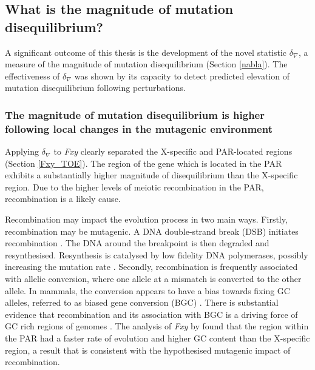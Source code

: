 \subsection{What is the magnitude of mutation disequilibrium?}

A significant outcome of this thesis is the development of the novel statistic $\delta_\nabla$, a measure of the magnitude of mutation disequilibrium (Section \ref{nabla}). The effectiveness of $\delta_\nabla$ was shown by its capacity to detect predicted elevation of mutation disequilibrium following perturbations. 

\subsubsection{The magnitude of mutation disequilibrium is higher following local changes in the mutagenic environment}

Applying $\delta_\nabla$ to \textit{Fxy} clearly separated the X-specific and PAR-located regions (Section \ref{Fxy_TOE}). The region of the gene which is located in the PAR exhibits a substantially higher magnitude of disequilibrium than the X-specific region. Due to the higher levels of meiotic recombination in the PAR, recombination is a likely cause. 

Recombination may impact the evolution process in two main ways. Firstly, recombination may be mutagenic. A DNA double-strand break (DSB) initiates recombination \citep{Keeney2001MechanismInitiation}. The DNA around the breakpoint is then degraded and resynthesised. Resynthesis is catalysed by low fidelity DNA polymerases, possibly increasing the mutation rate \citep{Rattray2003Error-proneAhead}. Secondly, recombination is frequently associated with allelic conversion, where one allele at a mismatch is converted to the other allele. In mammals, the conversion appears to have a bias towards fixing GC alleles, referred to as biased gene conversion (BGC) \citep{Birdsell2002IntegratingEvolution, Eyre-Walker1999EvidenceDNA., Mancera2008High-resolutionYeast}. There is substantial evidence that recombination and its association with BGC is a driving force of GC rich regions of genomes \citep{Meunier2004RecombinationGenome, Berglund2009HotspotsGenes,Galtier2009GC-biasedPrimates}. The analysis of \textit{Fxy} by \cite{Montoya-Burgos2003RecombinationGenomes} found that the region within the PAR had a faster rate of evolution and higher GC content than the X-specific region, a result that is consistent with the hypothesised mutagenic impact of recombination. 


